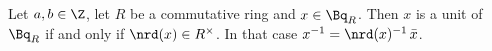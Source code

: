 Let $a,b\in\Z$, let $R$ be a commutative ring and $x\in\Bq_R$. Then $x$ is a unit of $\Bq_R$ if and only if $\nrd(x)\in R^\times$. In that
case $x^{-1}=\nrd(x)^{-1}\,\bar x$.
